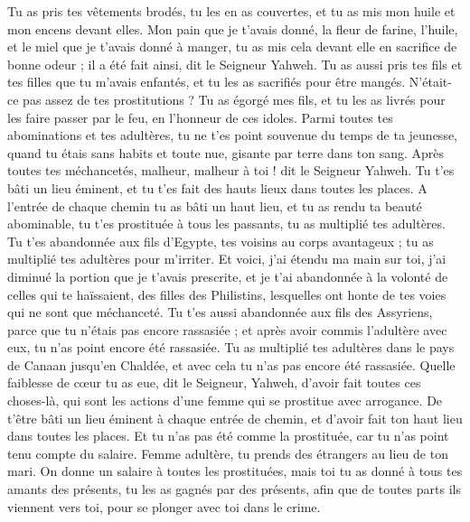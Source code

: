 \begin{multicols}{2}
Tu as pris tes vêtements brodés,  tu les en as couvertes, et tu as mis mon huile et mon encens devant elles.
Mon pain que je t'avais donné, la fleur de farine, l'huile, et le miel que je t'avais donné à manger, tu as mis cela devant elle en sacrifice de bonne odeur ; il a été fait ainsi, dit le Seigneur Yahweh.
Tu as aussi pris tes fils et tes filles que tu m'avais enfantés, et tu les as sacrifiés pour être mangés. N’était-ce pas assez de tes prostitutions ?
Tu as  égorgé mes fils, et tu les as livrés pour les faire passer par le feu, en l'honneur de ces idoles.
Parmi toutes tes abominations et tes adultères, tu ne t'es point souvenue du temps de ta jeunesse, quand tu étais sans habits et toute nue, gisante par terre dans ton sang.
Après toutes tes méchancetés, malheur, malheur à toi ! dit le Seigneur Yahweh.
Tu t'es bâti un lieu éminent, et tu t'es fait des hauts lieux dans toutes les places.
A l’entrée de chaque chemin tu as bâti un haut lieu, et tu as rendu ta beauté abominable, tu t'es prostituée à tous les passants, tu as multiplié tes adultères.
Tu t'es abandonnée aux fils d'Egypte, tes voisins au corps avantageux ; tu as multiplié tes adultères pour m'irriter.
Et voici, j'ai étendu ma main sur toi, j'ai diminué la portion que je t’avais prescrite, et je t'ai abandonnée à la volonté de celles qui te haïssaient, des filles des Philistins, lesquelles ont honte de tes voies qui ne sont que méchanceté.
Tu t'es aussi abandonnée aux fils des Assyriens, parce que tu n'étais pas encore rassasiée ; et après avoir commis l’adultère avec eux, tu n'as point encore été rassasiée.
Tu as multiplié tes adultères dans le pays de Canaan jusqu’en Chaldée, et avec cela tu n'as pas encore été rassasiée.
Quelle faiblesse de cœur tu as eue, dit le Seigneur, Yahweh, d'avoir fait toutes ces choses-là, qui sont les actions d'une femme qui se prostitue avec arrogance.
De t'être bâti un lieu éminent à chaque entrée de chemin, et d'avoir fait ton haut lieu dans toutes les places. Et tu n’as pas été comme la prostituée, car tu n'as point tenu compte du salaire.
Femme adultère, tu prends des étrangers au lieu de ton mari.
On donne un salaire à toutes les prostituées, mais toi tu as donné à tous tes amants des présents, tu les as gagnés par des présents, afin que de toutes parts ils viennent vers toi, pour se plonger avec toi dans le crime.

\end{multicols}
